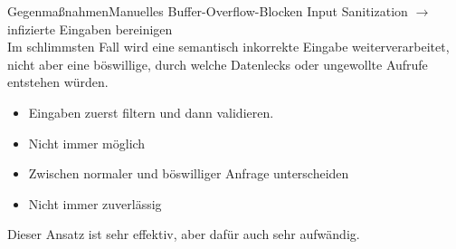 





\begin{frame}{Gegenmaßnahmen}{Manuelles Buffer-Overflow-Blocken}    
    Input Sanitization $\rightarrow$ infizierte Eingaben bereinigen\\ 
    Im schlimmsten Fall wird eine semantisch inkorrekte Eingabe weiterverarbeitet,\\
    nicht aber eine böswillige, durch welche Datenlecks oder ungewollte Aufrufe entstehen würden.
    \vspace{1em}
    \begin{itemize}
        \item Eingaben zuerst filtern und dann validieren.
        \item Nicht immer möglich
        \item Zwischen normaler und böswilliger Anfrage unterscheiden
        \item Nicht immer zuverlässig 
    \end{itemize} 
    \vspace{1em}
    Dieser Ansatz ist sehr effektiv, aber dafür auch sehr aufwändig.    
\end{frame}


